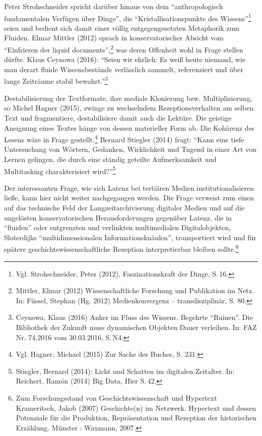 \documentclass[a4paper,
fontsize=11pt,
oneside,
numbers=noperiodatend,
parskip=half-,
bibliography=totoc,
final
]{scrartcl}
\begin{document}
Peter Strohschneider spricht darüber hinaus von dem
\enquote{anthropologisch fundamentalen Verfügen über Dinge}, die
\enquote{Kristallisationspunkte des Wissens}\footnote{Vgl.
  Strohschneider, Peter (2012), Faszinationskraft der Dinge, S.\,16.}
seien und bedient sich damit einer völlig entgegengesetzten Metaphorik
zum Fluiden. Elmar Mittler (2012) sprach in konservatorischer Absicht
vom \enquote{Einfrieren der liquid documents},\footnote{Mittler, Elmar
  (2012) Wissenschaftliche Forschung und Publikation im Netz. In:
  Füssel, Stephan (Hg. 2012) Medienkonvergenz -- transdisziplinär, S.
  80.} was deren Offenheit wohl in Frage stellen dürfte. Klaus Ceynowa
(2016): \enquote{Seien wir ehrlich: Es weiß heute niemand, wie man
derart fluide Wissensbestände verlässlich sammelt, referenziert und über
lange Zeiträume stabil bewahrt.}\footnote{Ceynowa, Klaus (2016) Anker im
  Fluss des Wissens. Begehrte \enquote{Ruinen}. Die Bibliothek der
  Zukunft muss dynamischen Objekten Dauer verleihen. In: FAZ Nr. 74.2016
  vom 30.03.2016, S.\,N4.}

Destabilisierung der Textformate, ihre mediale Klonierung bzw.
Multiplizierung, so Michel Hagner (2015), zwinge zu wechselndem
Rezeptionsverhalten am selben Text und fragmentiere, destabilisiere
damit auch die Lektüre. Die geistige Aneignung eines Textes hänge von
dessen materieller Form ab. Die Kohärenz des Lesens wäre in Frage
gestellt.\footnote{Vgl. Hagner, Michael (2015) Zur Sache des Buches, S.
  231.} Bernard Stiegler (2014) fragt: \enquote{Kann eine tiefe
Untersuchung von Wörtern, Gedanken, Wirklichkeit und Tugend in einer Art
von Lernen gelingen, die durch eine ständig geteilte Aufmerksamkeit und
Multitasking charakterisiert wird?}\footnote{Stiegler, Bernard (2014):
  Licht und Schatten im digitalen Zeitalter. In: Reichert, Ramón (2014)
  Big Data, Hier S.\,42.}

Der interessanten Frage, wie sich Latenz bei tertiären Medien
institutionalisieren ließe, kann hier nicht weiter nachgegangen werden.
Die Frage verweist zum einen auf das technische Feld der
Langzeitarchivierung digitaler Medien und auf die ungelösten
konservatorischen Herausforderungen gegenüber Latenz, die in
\enquote{fluiden} oder entgrenzten und verlinkten multimedialen
Digitalobjekten, Sloterdijks \enquote{multidimensionalen
Informationsknäulen}, transportiert wird und für spätere
geschichtswissenschaftliche Rezeption interpretierbar bleiben
sollte.\footnote{Zum Forschungsstand von Geschichtswissenschaft und
  Hypertext Krameritsch, Jakob (2007) Geschichte(n) im Netzwerk.
  Hypertext und dessen Potenziale für die Produktion, Repräsentation und
  Rezeption der historischen Erzählung. Münster : Waxmann, 2007.}
\end{document}
